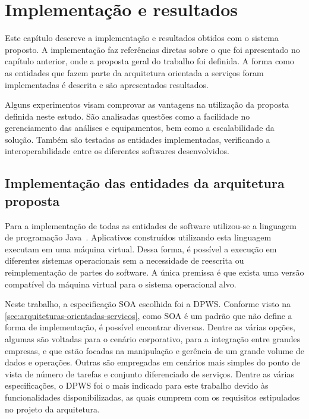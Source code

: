 \chapter{Implementação e resultados}
\label{cha:implementacao-resultados}

Este capítulo descreve a implementação e resultados obtidos com o sistema proposto. A implementação
faz referências diretas sobre o que foi apresentado no capítulo anterior, onde a proposta geral do
trabalho foi definida. A forma como as entidades que fazem parte da arquitetura orientada a serviços
foram implementadas é descrita e são apresentados resultados.

Alguns experimentos visam comprovar as vantagens na utilização da proposta definida neste estudo.
São analisadas questões como a facilidade no gerenciamento das análises e equipamentos, bem como a
escalabilidade da solução. Também são testadas as entidades implementadas, verificando a
interoperabilidade entre os diferentes softwares desenvolvidos.


\section{Implementação das entidades da arquitetura proposta}

Para a implementação de todas as entidades de software utilizou-se a linguagem de programação
Java~\cite{java2013homepage}. Aplicativos construídos utilizando esta linguagem executam em uma
máquina virtual. Dessa forma, é possível a execução em diferentes sistemas operacionais sem a
necessidade de reescrita ou reimplementação de partes do software. A única premissa é que exista uma
versão compatível da máquina virtual para o sistema operacional alvo.

Neste trabalho, a especificação \gls{SOA} escolhida foi a \gls{DPWS}. Conforme visto na
\cref{sec:arquiteturas-orientadas-servicos}, como \gls{SOA} é um padrão que não define a forma de
implementação, é possível encontrar diversas. Dentre as várias opções, algumas são voltadas para o
cenário corporativo, para a integração entre grandes empresas, e que estão focadas na manipulação e
gerência de um grande volume de dados e operações. Outras são empregadas em cenários mais simples do
ponto de vista de número de tarefas e conjunto diferenciado de serviços. Dentre as várias
especificações, o \gls{DPWS} foi o mais indicado para este trabalho devido às funcionalidades
disponibilizadas, as quais cumprem com os requisitos estipulados no projeto da arquitetura.

